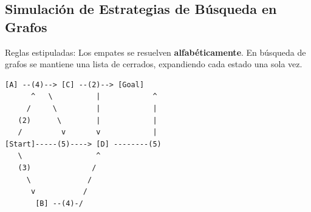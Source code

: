 \subsection{Simulación de Estrategias de Búsqueda en Grafos }

Reglas estipuladas: Los empates se resuelven \textbf{alfabéticamente}. En búsqueda de grafos se mantiene una lista de cerrados, expandiendo cada estado una sola vez.


\begin{lstlisting}[caption={Representación del grafo de transiciones}]
       [A] --(4)--> [C] --(2)--> [Goal]
      ^   \          |            ^
     /     \         |            |
   (2)      \        |            |
   /         v       v            |
[Start]-----(5)----> [D] --------(5)
   \                 ^
   (3)              /
     \             /
      v           /
       [B] --(4)-/
\end{lstlisting}

